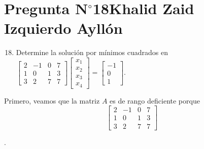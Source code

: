 \section{Pregunta N$^{\circ}$18\qquad Khalid Zaid Izquierdo Ayllón}

\begin{frame}
	\begin{enumerate}\setcounter{enumi}{17}
		\item

		      Determine la solución por mínimos cuadrados en
		      \begin{math}
			      \begin{bmatrix}
				      2 & -1 & 0 & 7 \\
				      1 & 0  & 1 & 3 \\
				      3 & 2  & 7 & 7
			      \end{bmatrix}
			      \begin{bmatrix}
				      x_{1} \\
				      x_{2} \\
				      x_{3} \\
				      x_{4}
			      \end{bmatrix}=
			      \begin{bmatrix}
				      -1 \\
				      0  \\
				      1
			      \end{bmatrix}
		      \end{math}.
	\end{enumerate}

	\begin{solution}

		Primero, veamos que la matriz $A$ es de rango deficiente porque
		\begin{equation*}
			\begin{bmatrix}
				2 & -1 & 0 & 7 \\
				1 & 0  & 1 & 3 \\
				3 & 2  & 7 & 7
			\end{bmatrix}
		\end{equation*}
	\end{solution}
\end{frame}

\begin{frame}
	\begin{solution}

		.
	\end{solution}
\end{frame}